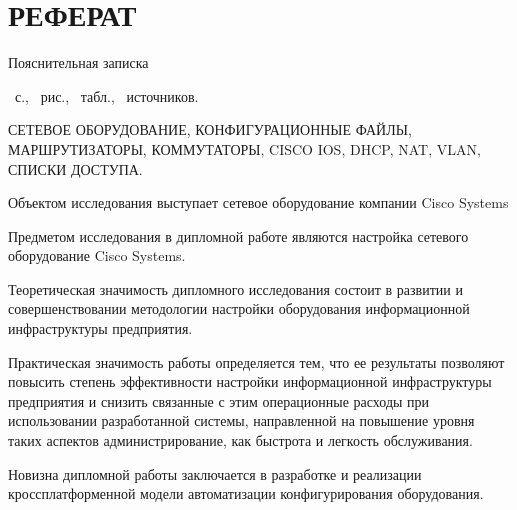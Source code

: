 
	
	\chapter*{РЕФЕРАТ}
	
	Пояснительная записка \begin{NoHyper}{\pageref{LastPage}}\end{NoHyper}~с., 
	\totfig~рис., \tottab~табл., \totbib~источников.%
	
	 
	
	СЕТЕВОЕ ОБОРУДОВАНИЕ, КОНФИГУРАЦИОННЫЕ ФАЙЛЫ, МАРШРУТИЗАТОРЫ, КОММУТАТОРЫ, CISCO IOS, DHCP, NAT, VLAN, СПИСКИ ДОСТУПА.
	
	Объектом исследования выступает сетевое оборудование компании Cisco Systems
	
	Предметом исследования в дипломной работе являются настройка сетевого оборудование Cisco Systems.
	
	Теоретическая значимость дипломного исследования состоит в развитии и совершенствовании методологии настройки оборудования информационной инфраструктуры предприятия.
	
	Практическая значимость работы определяется тем, что ее результаты позволяют повысить степень эффективности настройки информационной инфраструктуры предприятия и снизить связанные с этим операционные расходы при использовании разработанной системы, направленной на повышение уровня таких аспектов администрирование, как быстрота и легкость обслуживания.
	
	Новизна дипломной работы заключается в разработке и реализации кроссплатформенной модели автоматизации конфигурирования оборудования.

